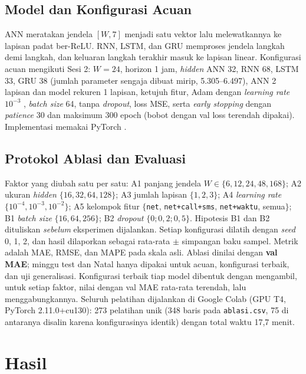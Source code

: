 \documentclass[conference,a4paper]{IEEEtran}
\begin{document}
\subsection{Model dan Konfigurasi Acuan}
ANN meratakan jendela $[W, 7]$ menjadi satu vektor lalu melewatkannya ke lapisan padat ber-ReLU. RNN, LSTM, dan GRU memproses jendela langkah demi langkah, dan keluaran langkah terakhir masuk ke lapisan linear. Konfigurasi acuan mengikuti Sesi 2: $W=24$, horizon 1 jam, \textit{hidden} ANN 32, RNN 68, LSTM 33, GRU 38 (jumlah parameter sengaja dibuat mirip, 5.305--6.497), ANN 2 lapisan dan model rekuren 1 lapisan, ketujuh fitur, Adam dengan \textit{learning rate} $10^{-3}$ \cite{kingma2015adam}, \textit{batch size} 64, tanpa \textit{dropout}, loss MSE, serta \textit{early stopping} dengan \textit{patience} 30 dan maksimum 300 epoch (bobot dengan val loss terendah dipakai). Implementasi memakai PyTorch \cite{paszke2019pytorch}.

\subsection{Protokol Ablasi dan Evaluasi}
Faktor yang diubah satu per satu: A1 panjang jendela $W\in\{6,12,24,48,168\}$; A2 ukuran \textit{hidden} $\{16,32,64,128\}$; A3 jumlah lapisan $\{1,2,3\}$; A4 \textit{learning rate} $\{10^{-4},10^{-3},10^{-2}\}$; A5 kelompok fitur $\{$\texttt{net}, \texttt{net+call+sms}, \texttt{net+waktu}, semua$\}$; B1 \textit{batch size} $\{16,64,256\}$; B2 \textit{dropout} $\{0;0{,}2;0{,}5\}$. Hipotesis B1 dan B2 dituliskan \emph{sebelum} eksperimen dijalankan. Setiap konfigurasi dilatih dengan \textit{seed} 0, 1, 2, dan hasil dilaporkan sebagai rata-rata $\pm$ simpangan baku sampel. Metrik adalah MAE, RMSE, dan MAPE pada skala asli. Ablasi dinilai dengan \textbf{val MAE}; minggu test dan Natal hanya dipakai untuk acuan, konfigurasi terbaik, dan uji generalisasi. Konfigurasi terbaik tiap model dibentuk dengan mengambil, untuk setiap faktor, nilai dengan val MAE rata-rata terendah, lalu menggabungkannya. Seluruh pelatihan dijalankan di Google Colab (GPU T4, PyTorch 2.11.0+cu130): 273 pelatihan unik (348 baris pada \texttt{ablasi.csv}, 75 di antaranya disalin karena konfigurasinya identik) dengan total waktu 17,7 menit.

\section{Hasil}
\end{document}
